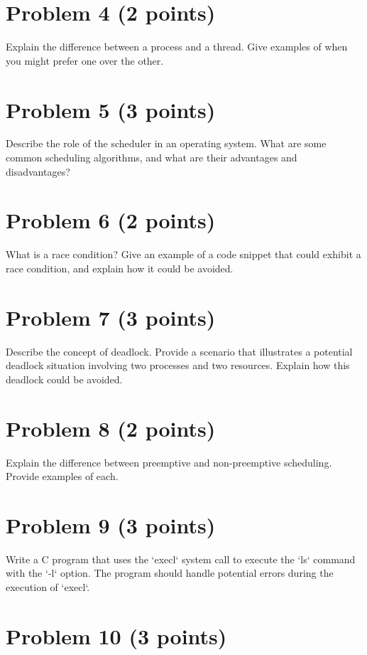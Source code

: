 \documentclass{article}
\begin{document}
\section*{Problem 4 (2 points)}

Explain the difference between a process and a thread.  Give examples of when you might prefer one over the other.


\section*{Problem 5 (3 points)}

Describe the role of the scheduler in an operating system. What are some common scheduling algorithms, and what are their advantages and disadvantages?


\section*{Problem 6 (2 points)}

What is a race condition? Give an example of a code snippet that could exhibit a race condition, and explain how it could be avoided.


\section*{Problem 7 (3 points)}

Describe the concept of deadlock.  Provide a scenario that illustrates a potential deadlock situation involving two processes and two resources.  Explain how this deadlock could be avoided.


\section*{Problem 8 (2 points)}

Explain the difference between preemptive and non-preemptive scheduling. Provide examples of each.


\section*{Problem 9 (3 points)}

Write a C program that uses the `execl` system call to execute the `ls` command with the `-l` option.  The program should handle potential errors during the execution of `execl`.


\section*{Problem 10 (3 points)}
\end{document}
